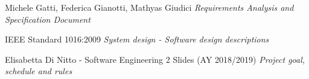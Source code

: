 \begin{thebibliography}{9}

	Michele Gatti, Federica Gianotti, Mathyas Giudici \emph{Requirements Analysis and Specification Document}

	IEEE Standard 1016:2009 \emph{System design - Software design descriptions}

  Elisabetta Di Nitto - Software Engineering 2 Slides (AY 2018/2019) \emph{Project goal, schedule and rules}

\end{thebibliography}
